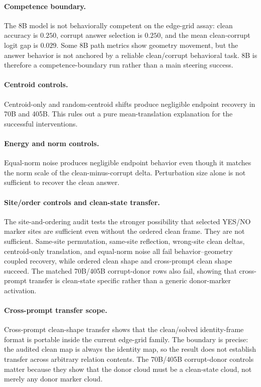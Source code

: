\documentclass[11pt]{article}
\begin{document}
\paragraph{Competence boundary.} The 8B model is not behaviorally competent on the edge-grid assay: clean accuracy is $0.250$, corrupt answer selection is $0.250$, and the mean clean-corrupt logit gap is $0.029$. Some 8B path metrics show geometry movement, but the answer behavior is not anchored by a reliable clean/corrupt behavioral task. 8B is therefore a competence-boundary run rather than a main steering success.

\paragraph{Centroid controls.} Centroid-only and random-centroid shifts produce negligible endpoint recovery in 70B and 405B. This rules out a pure mean-translation explanation for the successful interventions.

\paragraph{Energy and norm controls.} Equal-norm noise produces negligible endpoint behavior even though it matches the norm scale of the clean-minus-corrupt delta. Perturbation size alone is not sufficient to recover the clean answer.

\paragraph{Site/order controls and clean-state transfer.} The site-and-ordering audit tests the stronger possibility that selected YES/NO marker sites are sufficient even without the ordered clean frame. They are not sufficient. Same-site permutation, same-site reflection, wrong-site clean deltas, centroid-only translation, and equal-norm noise all fail behavior--geometry coupled recovery, while ordered clean shape and cross-prompt clean shape succeed. The matched 70B/405B corrupt-donor rows also fail, showing that cross-prompt transfer is clean-state specific rather than a generic donor-marker activation.

\paragraph{Cross-prompt transfer scope.} Cross-prompt clean-shape transfer shows that the clean/solved identity-frame format is portable inside the current edge-grid family. The boundary is precise: the audited clean map is always the identity map, so the result does not establish transfer across arbitrary relation contents. The 70B/405B corrupt-donor controls matter because they show that the donor cloud must be a clean-state cloud, not merely any donor marker cloud.
\end{document}

